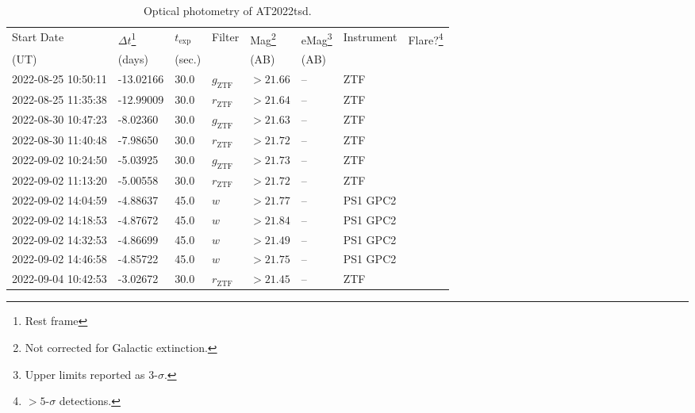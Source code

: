 \documentclass{nature_plusfigure}
\begin{document}
\clearpage

\begin{supplement}

\renewcommand{\thefigure}{Supplementary Information Figure~\arabic{figure}}
\renewcommand{\figurename}{}
\setcounter{figure}{0}
%


\renewcommand{\thetable}{Supplementary Information Table~\arabic{table}}
 \renewcommand{\tablename}{}
\setcounter{table}{0}

\begin{center} 
\begin{longtable}{llllllll} 
\caption{Optical photometry of AT2022tsd.} 
\label{tab:optical-photometry}\\ 
\hline\hline
Start Date & $\Delta t$\footnote{Rest frame} & $t_\mathrm{exp}$ & Filter & Mag\footnote{Not corrected for Galactic extinction.} & eMag\footnote{Upper limits reported as 3-$\sigma$.} & Instrument & Flare?\footnote{$>5$-$\sigma$ detections.}\\ 
(UT) & (days) & (sec.) &  & (AB) & (AB) &  & \\ 
\hline
2022-08-25 10:50:11 & -13.02166 & 30.0 & ${g}_\mathrm{ZTF}$ & $>21.66$ & -- & ZTF &  \\ 
2022-08-25 11:35:38 & -12.99009 & 30.0 & ${r}_\mathrm{ZTF}$ & $>21.64$ & -- & ZTF &  \\ 
2022-08-30 10:47:23 & -8.02360 & 30.0 & ${g}_\mathrm{ZTF}$ & $>21.63$ & -- & ZTF &  \\ 
2022-08-30 11:40:48 & -7.98650 & 30.0 & ${r}_\mathrm{ZTF}$ & $>21.72$ & -- & ZTF &  \\ 
2022-09-02 10:24:50 & -5.03925 & 30.0 & ${g}_\mathrm{ZTF}$ & $>21.73$ & -- & ZTF &  \\ 
2022-09-02 11:13:20 & -5.00558 & 30.0 & ${r}_\mathrm{ZTF}$ & $>21.72$ & -- & ZTF &  \\ 
2022-09-02 14:04:59 & -4.88637 & 45.0 & $w$ & $>21.77$ & -- & PS1 GPC2 &  \\ 
2022-09-02 14:18:53 & -4.87672 & 45.0 & $w$ & $>21.84$ & -- & PS1 GPC2 &  \\ 
2022-09-02 14:32:53 & -4.86699 & 45.0 & $w$ & $>21.49$ & -- & PS1 GPC2 &  \\ 
2022-09-02 14:46:58 & -4.85722 & 45.0 & $w$ & $>21.75$ & -- & PS1 GPC2 &  \\ 
2022-09-04 10:42:53 & -3.02672 & 30.0 & ${r}_\mathrm{ZTF}$ & $>21.45$ & -- & ZTF &  \\ 

\end{longtable}
\end{center}
\end{supplement}
\end{document}
